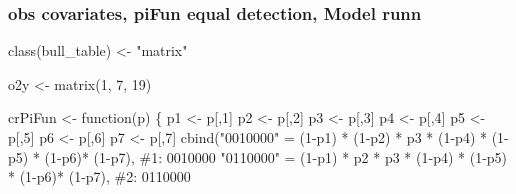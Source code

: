 \documentclass[
  letterpaper,
  DIV=11,
  numbers=noendperiod]{scrartcl}
\newenvironment{Shaded}{\begin{snugshade}}{\end{snugshade}}
\newcommand{\CommentTok}[1]{\textcolor[rgb]{0.37,0.37,0.37}{#1}}
\newcommand{\ControlFlowTok}[1]{\textcolor[rgb]{0.00,0.23,0.31}{#1}}
\newcommand{\DecValTok}[1]{\textcolor[rgb]{0.68,0.00,0.00}{#1}}
\newcommand{\FunctionTok}[1]{\textcolor[rgb]{0.28,0.35,0.67}{#1}}
\newcommand{\NormalTok}[1]{\textcolor[rgb]{0.00,0.23,0.31}{#1}}
\newcommand{\OtherTok}[1]{\textcolor[rgb]{0.00,0.23,0.31}{#1}}
\newcommand{\SpecialCharTok}[1]{\textcolor[rgb]{0.37,0.37,0.37}{#1}}
\newcommand{\StringTok}[1]{\textcolor[rgb]{0.13,0.47,0.30}{#1}}
\begin{document}
\hypertarget{obs-covariates-pifun-equal-detection-model-runn}{%
\subsubsection{obs covariates, piFun equal detection, Model
runn}\label{obs-covariates-pifun-equal-detection-model-runn}}

\begin{Shaded}
\begin{Highlighting}[]
\FunctionTok{class}\NormalTok{(bull\_table) }\OtherTok{\textless{}{-}} \StringTok{"matrix"}

\NormalTok{o2y }\OtherTok{\textless{}{-}} \FunctionTok{matrix}\NormalTok{(}\DecValTok{1}\NormalTok{, }\DecValTok{7}\NormalTok{, }\DecValTok{19}\NormalTok{)}

\NormalTok{crPiFun }\OtherTok{\textless{}{-}} \ControlFlowTok{function}\NormalTok{(p) \{}
\NormalTok{    p1 }\OtherTok{\textless{}{-}}\NormalTok{ p[,}\DecValTok{1}\NormalTok{]}
\NormalTok{    p2 }\OtherTok{\textless{}{-}}\NormalTok{ p[,}\DecValTok{2}\NormalTok{]}
\NormalTok{    p3 }\OtherTok{\textless{}{-}}\NormalTok{ p[,}\DecValTok{3}\NormalTok{]}
\NormalTok{    p4 }\OtherTok{\textless{}{-}}\NormalTok{ p[,}\DecValTok{4}\NormalTok{]}
\NormalTok{    p5 }\OtherTok{\textless{}{-}}\NormalTok{ p[,}\DecValTok{5}\NormalTok{]}
\NormalTok{    p6 }\OtherTok{\textless{}{-}}\NormalTok{ p[,}\DecValTok{6}\NormalTok{]}
\NormalTok{    p7 }\OtherTok{\textless{}{-}}\NormalTok{ p[,}\DecValTok{7}\NormalTok{]}
    \FunctionTok{cbind}\NormalTok{(}\StringTok{"0010000"} \OtherTok{=}\NormalTok{ (}\DecValTok{1}\SpecialCharTok{{-}}\NormalTok{p1) }\SpecialCharTok{*}\NormalTok{ (}\DecValTok{1}\SpecialCharTok{{-}}\NormalTok{p2) }\SpecialCharTok{*}\NormalTok{ p3 }\SpecialCharTok{*}\NormalTok{ (}\DecValTok{1}\SpecialCharTok{{-}}\NormalTok{p4) }\SpecialCharTok{*}\NormalTok{ (}\DecValTok{1}\SpecialCharTok{{-}}\NormalTok{p5) }\SpecialCharTok{*}\NormalTok{ (}\DecValTok{1}\SpecialCharTok{{-}}\NormalTok{p6)}\SpecialCharTok{*}\NormalTok{ (}\DecValTok{1}\SpecialCharTok{{-}}\NormalTok{p7),    }\CommentTok{\#1: 0010000    }
          \StringTok{"0110000"} \OtherTok{=}\NormalTok{ (}\DecValTok{1}\SpecialCharTok{{-}}\NormalTok{p1) }\SpecialCharTok{*}\NormalTok{ p2 }\SpecialCharTok{*}\NormalTok{ p3 }\SpecialCharTok{*}\NormalTok{ (}\DecValTok{1}\SpecialCharTok{{-}}\NormalTok{p4) }\SpecialCharTok{*}\NormalTok{ (}\DecValTok{1}\SpecialCharTok{{-}}\NormalTok{p5) }\SpecialCharTok{*}\NormalTok{ (}\DecValTok{1}\SpecialCharTok{{-}}\NormalTok{p6)}\SpecialCharTok{*}\NormalTok{ (}\DecValTok{1}\SpecialCharTok{{-}}\NormalTok{p7),        }\CommentTok{\#2: 0110000}

\end{Highlighting}
\end{Shaded}
\end{document}
